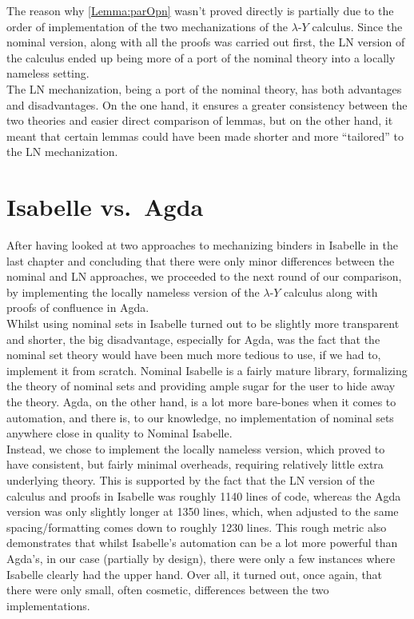 \documentclass[a4paper, 12pt, twoside]{style/ociamthesis}
\theoremstyle{plain}
\theoremstyle{definition}
\theoremstyle{remark}
\newcommand{\lamy}{\lambda\text{-}Y}
\begin{document}
The reason why \cref{Lemma:parOpn} wasn't proved directly is partially
due to the order of implementation of the two mechanizations of the
\(\lamy\) calculus. Since the nominal version, along with all the proofs
was carried out first, the LN version of the calculus ended up being
more of a port of the nominal theory into a locally nameless setting.\\
The LN mechanization, being a port of the nominal theory, has both
advantages and disadvantages. On the one hand, it ensures a greater
consistency between the two theories and easier direct comparison of
lemmas, but on the other hand, it meant that certain lemmas could have
been made shorter and more ``tailored'' to the LN mechanization.

\chapter{Isabelle vs.~Agda}\label{comp-agda}

\label{chap:compAgda}

After having looked at two approaches to mechanizing binders in Isabelle
in the last chapter and concluding that there were only minor
differences between the nominal and LN approaches, we proceeded to the
next round of our comparison, by implementing the locally nameless
version of the \(\lamy\) calculus along with proofs of confluence in
Agda.\\
Whilst using nominal sets in Isabelle turned out to be slightly more
transparent and shorter, the big disadvantage, especially for Agda, was
the fact that the nominal set theory would have been much more tedious
to use, if we had to, implement it from scratch. Nominal Isabelle is a
fairly mature library, formalizing the theory of nominal sets and
providing ample sugar for the user to hide away the theory. Agda, on the
other hand, is a lot more bare-bones when it comes to automation, and
there is, to our knowledge, no implementation of nominal sets anywhere
close in quality to Nominal Isabelle.\\
Instead, we chose to implement the locally nameless version, which
proved to have consistent, but fairly minimal overheads, requiring
relatively little extra underlying theory. This is supported by the fact
that the LN version of the calculus and proofs in Isabelle was roughly
1140 lines of code, whereas the Agda version was only slightly longer at
1350 lines, which, when adjusted to the same spacing/formatting comes
down to roughly 1230 lines. This rough metric also demonstrates that
whilst Isabelle's automation can be a lot more powerful than Agda's, in
our case (partially by design), there were only a few instances where
Isabelle clearly had the upper hand. Over all, it turned out, once
again, that there were only small, often cosmetic, differences between
the two implementations.
\end{document}
